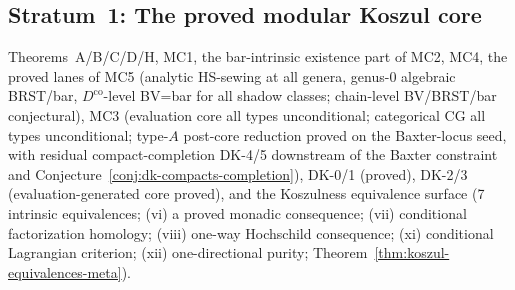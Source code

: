 \subsection*{Stratum~1: The proved modular Koszul core}
Theorems~A/B/C/D/H, MC1, the bar-intrinsic existence part of MC2,
MC4, the proved lanes of MC5
\textup{(}analytic HS-sewing at all genera, genus-$0$ algebraic
BRST/bar, $D^{\mathrm{co}}$-level BV=bar for all shadow classes;
chain-level BV/BRST/bar conjectural\textup{)},
MC3 \textup{(}evaluation core all types unconditional; categorical
CG all types unconditional; type-$A$ post-core reduction proved on the
Baxter-locus seed, with residual compact-completion DK-4/5 downstream
of the Baxter constraint and Conjecture~\ref{conj:dk-compacts-completion}\textup{)},
DK-0/1 (proved), DK-2/3 (evaluation-generated core proved),
and the Koszulness equivalence surface
(7 intrinsic equivalences; \textup{(}vi\textup{)} a proved monadic
consequence; \textup{(}vii\textup{)} conditional factorization
homology; \textup{(}viii\textup{)} one-way Hochschild consequence;
\textup{(}xi\textup{)} conditional Lagrangian criterion;
\textup{(}xii\textup{)} one-directional purity;
Theorem~\ref{thm:koszul-equivalences-meta}).

